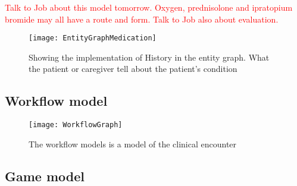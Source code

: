  
 \textcolor{red}{Talk to Job about this model tomorrow. Oxygen, prednisolone and ipratopium bromide may all have a route and form. Talk to Job also about evaluation.}
\begin{figure}[h!]
	\caption {Showing the implementation of History in the entity graph. What the patient or caregiver tell about the patient's condition}
	\label{fig:EntityGraphMedication}
	\texttt{[image: EntityGraphMedication]}
\end{figure}





\subsection{Workflow model}
\begin{figure}[h!]
	\caption {The workflow models is a model of the clinical encounter}
	\label{fig:WorkflowGraph}
	\texttt{[image: WorkflowGraph]}
\end{figure}


\subsection{Game model}